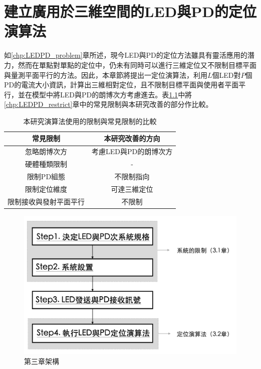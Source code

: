 \chapter{建立廣用於三維空間的LED與PD的定位演算法}
\label{chp:3}

如\ref{chp:LEDPD_problem}章所述，現今LED與PD的定位方法雖具有靈活應用的潛力，然而在單點對單點的定位中，仍未有同時可以進行三維定位又不限制目標平面與量測平面平行的方法。因此，本章節將提出一定位演算法，利用$L$個LED對$P$個PD的電流大小資訊，計算出三維相對定位，且不限制目標平面與使用者平面平行，並在模型中將LED與PD的朗博次方考慮進去。表\ref{tab:restrict_compare}中將\ref{chp:LEDPD_restrict}章中的常見限制與本研究改善的部分作比較。


\begin{table}[htpb]
    \begin{center}
      \caption{本研究演算法使用的限制與常見限制的比較}
      \label{tab:restrict_compare}
      \begin{tabular}{|c|c|} 
        \hline
         常見限制 &
          \textbf{本研究改善的方向}\\\hline
          忽略朗博次方&考慮LED與PD的朗博次方\\
          硬體種類限制& - \\
          限制PD組態& 不限制指向\\
          限制定位維度&可達三維定位\\
          限制接收與發射平面平行&不限制\\
        \hline
      \end{tabular}
    \end{center}
  \end{table}

\begin{figure}[htpb]
    \centering
    \includegraphics[width=12cm]{ch3pic/chp3_flow.png}
    \caption{第三章架構}
    \label{pic:chp3_flow}
\end{figure}


